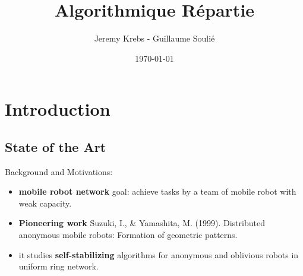\documentclass{beamer}
\title{Algorithmique Répartie}
\author{Jeremy Krebs - Guillaume Soulié}
\institute{Université Paris Saclay}
\date{\today}
\begin{document}
\begin{frame}
\titlepage
\end{frame}

\begin{frame}
  \tableofcontents
\end{frame}      



\section{Introduction}

\subsection{State of the Art}
\begin{frame}
	Background and Motivations:
	\begin{itemize}
		\pause
		\item \textbf{mobile robot network} goal: achieve tasks by a team of 
		mobile robot with weak capacity. 
		\pause
		\item \textbf{Pioneering work} Suzuki, I., \& Yamashita, M. (1999). Distributed anonymous mobile robots: Formation of geometric patterns.
		\pause
		\item it studies \textbf{self-stabilizing} algorithms for anonymous and oblivious robots in uniform ring network.
	\end{itemize}
\end{frame}
\end{document}
